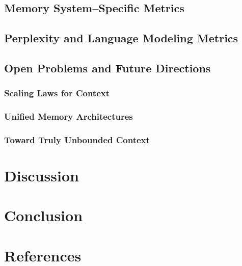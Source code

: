 \documentclass[12pt, letterpaper]{article}
\begin{document}
\subsection{Memory System--Specific Metrics}
\subsection{Perplexity and Language Modeling Metrics}
\subsection{Open Problems and Future Directions}
\subsubsection{Scaling Laws for Context}
\subsubsection{Unified Memory Architectures}
\subsubsection{Toward Truly Unbounded Context}

\section*{Discussion}

\section*{Conclusion}

\section*{References}
\end{document}
